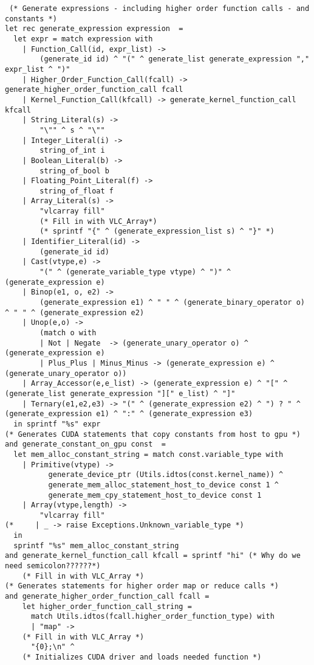 \begin{verbatim}
 (* Generate expressions - including higher order function calls - and constants *)
let rec generate_expression expression  =
  let expr = match expression with
    | Function_Call(id, expr_list) ->
        (generate_id id) ^ "(" ^ generate_list generate_expression "," expr_list ^ ")"
    | Higher_Order_Function_Call(fcall) -> generate_higher_order_function_call fcall
    | Kernel_Function_Call(kfcall) -> generate_kernel_function_call kfcall
    | String_Literal(s) -> 
        "\"" ^ s ^ "\""
    | Integer_Literal(i) -> 
        string_of_int i
    | Boolean_Literal(b) -> 
        string_of_bool b
    | Floating_Point_Literal(f) ->
        string_of_float f
    | Array_Literal(s) -> 
        "vlcarray fill"
        (* Fill in with VLC_Array*)
        (* sprintf "{" ^ (generate_expression_list s) ^ "}" *)
    | Identifier_Literal(id) -> 
        (generate_id id)
    | Cast(vtype,e) ->
        "(" ^ (generate_variable_type vtype) ^ ")" ^ (generate_expression e)
    | Binop(e1, o, e2) -> 
        (generate_expression e1) ^ " " ^ (generate_binary_operator o) ^ " " ^ (generate_expression e2)
    | Unop(e,o) ->
        (match o with 
        | Not | Negate  -> (generate_unary_operator o) ^ (generate_expression e)
        | Plus_Plus | Minus_Minus -> (generate_expression e) ^ (generate_unary_operator o))
    | Array_Accessor(e,e_list) -> (generate_expression e) ^ "[" ^ (generate_list generate_expression "][" e_list) ^ "]"
    | Ternary(e1,e2,e3) -> "(" ^ (generate_expression e2) ^ ") ? " ^ (generate_expression e1) ^ ":" ^ (generate_expression e3)
  in sprintf "%s" expr
(* Generates CUDA statements that copy constants from host to gpu *)
and generate_constant_on_gpu const  = 
  let mem_alloc_constant_string = match const.variable_type with 
    | Primitive(vtype) ->
          generate_device_ptr (Utils.idtos(const.kernel_name)) ^ 
          generate_mem_alloc_statement_host_to_device const 1 ^ 
          generate_mem_cpy_statement_host_to_device const 1 
    | Array(vtype,length) ->
        "vlcarray fill"
(*     | _ -> raise Exceptions.Unknown_variable_type *)
  in 
  sprintf "%s" mem_alloc_constant_string
and generate_kernel_function_call kfcall = sprintf "hi" (* Why do we need semicolon??????*)
    (* Fill in with VLC_Array *)
(* Generates statements for higher order map or reduce calls *)
and generate_higher_order_function_call fcall = 
    let higher_order_function_call_string = 
      match Utils.idtos(fcall.higher_order_function_type) with
      | "map" -> 
    (* Fill in with VLC_Array *)
      "{0};\n" ^ 
    (* Initializes CUDA driver and loads needed function *)

\end{verbatim}
